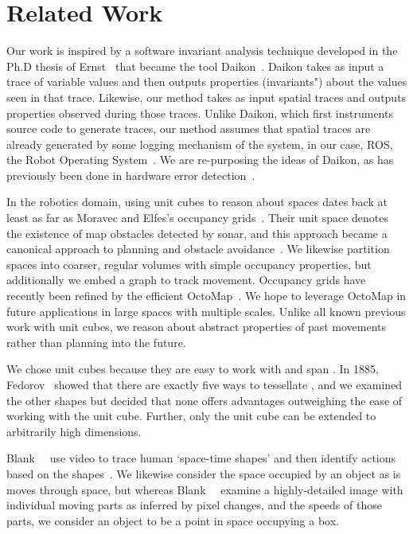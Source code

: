 \section{Related Work}
\label{sec:related}

Our work is inspired by a software invariant analysis technique developed in the Ph.D thesis of Ernst~\cite{ernst2000dynamically} that became the tool Daikon~\cite{ernst2007daikon}.
Daikon takes as input a trace of variable values and then outputs properties (invariants") about the values seen in that trace.
Likewise, our method takes as input spatial traces and outputs properties observed during those traces.
Unlike Daikon, which first instruments source code to generate traces, our method assumes that spatial traces are already generated by some logging mechanism of the system, in our case, ROS, the Robot Operating System~\cite{quigley2009ros}.
We are re-purposing the ideas of Daikon, as has previously been done in hardware error detection~\cite{sahoo2008using}.

In the robotics domain, using unit cubes to reason about spaces dates back at least as far as Moravec and Elfes's occupancy grids~\cite{moravec1985high}.
Their unit space denotes the existence of map obstacles detected by sonar, and this approach became a canonical approach to planning and obstacle avoidance~\cite{siegwart2011introduction,elfes1989using,borenstein1989real}.
We likewise partition spaces into coarser, regular volumes with simple occupancy properties, but additionally we embed a graph to track movement.
Occupancy grids have recently been refined by the efficient OctoMap~\cite{wurm2010octomap}.
We hope to leverage OctoMap in future applications in large spaces with multiple scales.
Unlike all known previous work with unit cubes, we reason about abstract properties of past movements rather than planning into the future.

We chose unit cubes because they are easy to work with and span \rthree. 
In 1885, Fedorov~\cite{fedorov1885elements} showed that there are exactly five ways to tessellate \rthree, and we examined the other shapes but decided that none offers advantages outweighing the ease of working with the unit cube.
Further, only the unit cube can be extended to arbitrarily high dimensions.

Blank~\etal~ use video to trace human `space-time shapes' and then identify actions based on the shapes~\cite{blank2005actions}.
We likewise consider the space occupied by an object as is moves through space, but whereas Blank~\etal~ examine a highly-detailed image with individual moving parts as inferred by pixel changes, and the speeds of those parts, we consider an object to be a point in space occupying a box.

